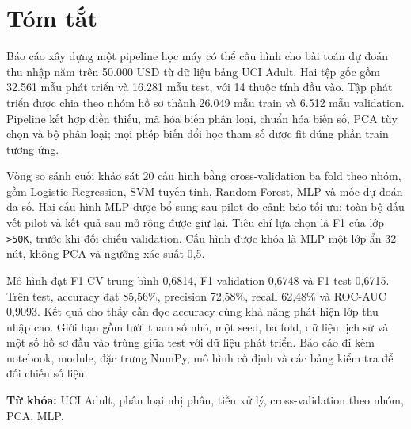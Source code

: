 \chapter*{Tóm tắt}
{}
Báo cáo xây dựng một pipeline học máy có thể cấu hình cho bài toán dự đoán thu nhập năm trên 50.000 USD từ dữ liệu bảng UCI Adult. Hai tệp gốc gồm 32.561 mẫu phát triển và 16.281 mẫu test, với 14 thuộc tính đầu vào. Tập phát triển được chia theo nhóm hồ sơ thành 26.049 mẫu train và 6.512 mẫu validation. Pipeline kết hợp điền thiếu, mã hóa biến phân loại, chuẩn hóa biến số, PCA tùy chọn và bộ phân loại; mọi phép biến đổi học tham số được fit đúng phần train tương ứng.

Vòng so sánh cuối khảo sát 20 cấu hình bằng cross-validation ba fold theo nhóm, gồm Logistic Regression, SVM tuyến tính, Random Forest, MLP và mốc dự đoán đa số. Hai cấu hình MLP được bổ sung sau pilot do cảnh báo tối ưu; toàn bộ dấu vết pilot và kết quả sau mở rộng được giữ lại. Tiêu chí lựa chọn là F1 của lớp \texttt{>50K}, trước khi đối chiếu validation. Cấu hình được khóa là MLP một lớp ẩn 32 nút, không PCA và ngưỡng xác suất 0,5.

Mô hình đạt F1 CV trung bình 0,6814, F1 validation 0,6748 và F1 test 0,6715. Trên test, accuracy đạt 85,56\%, precision 72,58\%, recall 62,48\% và ROC-AUC 0,9093. Kết quả cho thấy cần đọc accuracy cùng khả năng phát hiện lớp thu nhập cao. Giới hạn gồm lưới tham số nhỏ, một seed, ba fold, dữ liệu lịch sử và một số hồ sơ đầu vào trùng giữa test với dữ liệu phát triển. Báo cáo đi kèm notebook, module, đặc trưng NumPy, mô hình cố định và các bảng kiểm tra để đối chiếu số liệu.

\noindent\textbf{Từ khóa:} UCI Adult, phân loại nhị phân, tiền xử lý, cross-validation theo nhóm, PCA, MLP.
